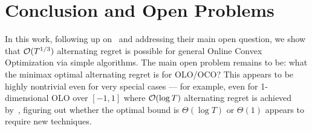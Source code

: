 \section{Conclusion and Open Problems}

In this work, following up on~\citet{cevher2024alternation} and addressing their main open question, we show that $\mathcal{O}(T^{1/3})$ alternating regret is possible for general Online Convex Optimization via simple algorithms.
The main open problem remains to be: what the minimax optimal alternating regret is for OLO/OCO?
This appears to be highly nontrivial even for very special cases --- for example, even for 1-dimensional OLO over $[-1,1]$ where $\mathcal{O}(\log T)$ alternating regret is achieved by~\citet{cevher2024alternation}, figuring out whether the optimal bound is $\Theta(\log T)$ or $\Theta(1)$ appears to require new techniques.